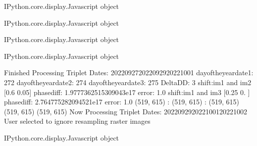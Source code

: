 \documentclass[letterpaper,10pt]{sphinxmanual}
\begin{document}
\begin{sphinxVerbatim}[commandchars=\\\{\}]
\PYGZlt{}IPython.core.display.Javascript object\PYGZgt{}
\end{sphinxVerbatim}



\begin{sphinxVerbatim}[commandchars=\\\{\}]
\PYGZlt{}IPython.core.display.Javascript object\PYGZgt{}
\end{sphinxVerbatim}



\begin{sphinxVerbatim}[commandchars=\\\{\}]
\PYGZlt{}IPython.core.display.Javascript object\PYGZgt{}
\end{sphinxVerbatim}



\begin{sphinxVerbatim}[commandchars=\\\{\}]
\PYGZlt{}IPython.core.display.Javascript object\PYGZgt{}
\end{sphinxVerbatim}



\begin{sphinxVerbatim}[commandchars=\\\{\}]
Finished Processing Triplet Dates:  20220927\PYGZhy{}20220929\PYGZhy{}20221001
day\PYGZus{}of\PYGZus{}the\PYGZus{}year\PYGZus{}date1:  272
\PYGZhy{}\PYGZhy{}\PYGZhy{}\PYGZhy{}\PYGZhy{}\PYGZhy{}\PYGZhy{}\PYGZhy{}\PYGZhy{}\PYGZhy{}\PYGZhy{}\PYGZhy{}\PYGZhy{}\PYGZhy{}\PYGZhy{}\PYGZhy{}\PYGZhy{}\PYGZhy{}\PYGZhy{}\PYGZhy{}\PYGZhy{}
day\PYGZus{}of\PYGZus{}the\PYGZus{}year\PYGZus{}date2:  274
\PYGZhy{}\PYGZhy{}\PYGZhy{}\PYGZhy{}\PYGZhy{}\PYGZhy{}\PYGZhy{}\PYGZhy{}\PYGZhy{}\PYGZhy{}\PYGZhy{}\PYGZhy{}\PYGZhy{}\PYGZhy{}\PYGZhy{}\PYGZhy{}\PYGZhy{}\PYGZhy{}\PYGZhy{}\PYGZhy{}\PYGZhy{}
day\PYGZus{}of\PYGZus{}the\PYGZus{}year\PYGZus{}date3:  275
\PYGZhy{}\PYGZhy{}\PYGZhy{}\PYGZhy{}\PYGZhy{}\PYGZhy{}\PYGZhy{}\PYGZhy{}\PYGZhy{}\PYGZhy{}\PYGZhy{}\PYGZhy{}\PYGZhy{}\PYGZhy{}\PYGZhy{}\PYGZhy{}\PYGZhy{}\PYGZhy{}\PYGZhy{}\PYGZhy{}\PYGZhy{}
Delta\PYGZus{}DD: 3
shift:im1 and im2 [0.6  0.05] phasediff: 1.9777362515309043e\PYGZhy{}17 error: 1.0
shift:im1 and im3 [0.25 0.  ] phasediff: \PYGZhy{}2.764775282094521e\PYGZhy{}17 error: 1.0
(519, 615) :  (519, 615) :  (519, 615)
(519, 615)
(519, 615)
Now Processing Triplet Dates:  20220929\PYGZhy{}20221001\PYGZhy{}20221002
 User selected to ignore resampling raster images 



\PYGZlt{}IPython.core.display.Javascript object\PYGZgt{}
\end{sphinxVerbatim}
\end{document}
